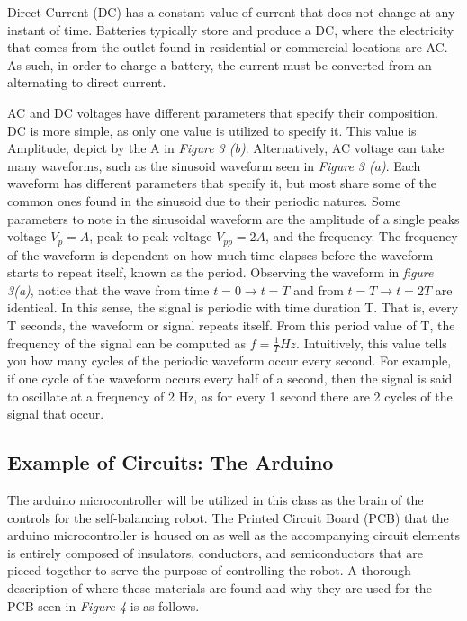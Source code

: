 \documentclass[12pt]{article}
\begin{document}
Direct Current (DC) has a constant value of current that does not change at any instant of time. Batteries typically store and produce a DC, where the electricity that comes from the outlet found in residential or commercial locations are AC. As such, in order to charge a battery, the current must be converted from an alternating to direct current.

AC and DC voltages have different parameters that specify their composition. DC is more simple, as only one value is utilized to specify it. This value is Amplitude, depict by the A in \textit{Figure 3 (b)}. Alternatively, AC voltage can take many waveforms, such as the sinusoid waveform seen in \textit{Figure 3 (a)}. Each waveform has different parameters that specify it, but most share some of the common ones found in the sinusoid due to their periodic natures. Some parameters to note in the sinusoidal waveform are the amplitude of a single peaks voltage $V_p = A$, peak-to-peak voltage $V_{pp} = 2A$, and the frequency. The frequency of the waveform is dependent on how much time elapses before the waveform starts to repeat itself, known as the period. Observing the waveform in \textit{figure 3(a)}, notice that the wave from time $t=0 \longrightarrow t=T$ and from $t=T \longrightarrow t=2T$ are identical. In this sense, the signal is periodic with time duration T. That is, every T seconds, the waveform or signal repeats itself. From this period value of T, the frequency of the signal can be computed as $f = \frac{1}{T} Hz$. Intuitively, this value tells you how many cycles of the periodic waveform occur every second. For example, if one cycle of the waveform occurs every half of a second, then the signal is said to oscillate at a frequency of 2 Hz, as for every 1 second there are 2 cycles of the signal that occur.

\subsection{Example of Circuits: The Arduino}

The arduino microcontroller will be utilized in this class as the brain of the controls for the self-balancing robot. The Printed Circuit Board (PCB) that the arduino microcontroller is housed on as well as the accompanying circuit elements is entirely composed of insulators, conductors, and semiconductors that are pieced together to serve the purpose of controlling the robot. A thorough description of where these materials are found and why they are used for the PCB seen in \textit{Figure 4} is as follows.
\end{document}
